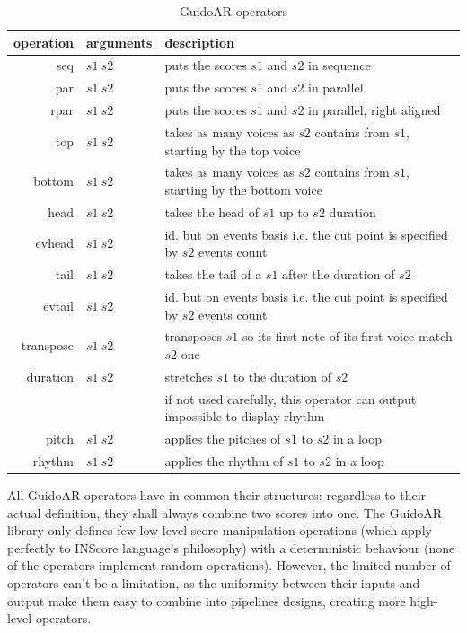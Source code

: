 \documentclass{article}
\begin{document}
\begin{table}[htdp]
\begin{center}
\begin{tabular}{rll}
\hline
operation & arguments		&	description \\
\hline
seq 	&	$s1\ s2$		& puts the scores $s1$ and $s2$ in sequence \\
par 	&	$s1\ s2$		& puts the scores $s1$ and $s2$ in parallel \\ 
rpar	&	$s1\ s2$		& puts the scores $s1$ and $s2$ in parallel, right aligned \\
top 	&	$s1\ s2$ 	& takes as many voices as $s2$ contains from $s1$, starting by the top voice \\
bottom 	&	$s1\ s2$ 	& takes as many voices as $s2$ contains from $s1$, starting by the bottom voice  \\
head	& 	$s1\ s2$	& takes the head of $s1$ up to $s2$ duration \\
evhead 	&	$s1\ s2$	& id. but on events basis i.e. the cut point is specified by $s2$ events count \\
tail	&	$s1\ s2$ 	& takes the tail of a $s1$ after the duration of $s2$ \\
evtail 	&	$s1\ s2$ 	& id. but on events basis i.e. the cut point is specified by $s2$ events count \\
transpose 	&	$s1\ s2$	& transposes $s1$ so its first note of its first voice match $s2$ one \\
duration 	&	$s1\ s2$	& stretches $s1$ to the duration of $s2$  \\
			& 	& if not used carefully, this operator can output impossible to display rhythm\\
pitch 	&	$s1\ s2$	& applies the pitches of $s1$ to $s2$ in a loop \\
rhythm 	&	$s1\ s2$	& applies the rhythm of $s1$ to $s2$ in a loop \\
\hline
\end{tabular}
\end{center}

\caption{GuidoAR operators}
\label{operations}
\end{table}

All GuidoAR operators have in common their structures: regardless to their actual definition, they shall always combine two scores into one. The GuidoAR library only defines few low-level score manipulation operations  (which apply perfectly to INScore language's philosophy) with a deterministic behaviour (none of the operators implement random operations). However, the limited number of operators can't be a limitation, as the uniformity between their inputs and output make them easy to combine into pipelines designs, creating more high-level operators.
\end{document}
